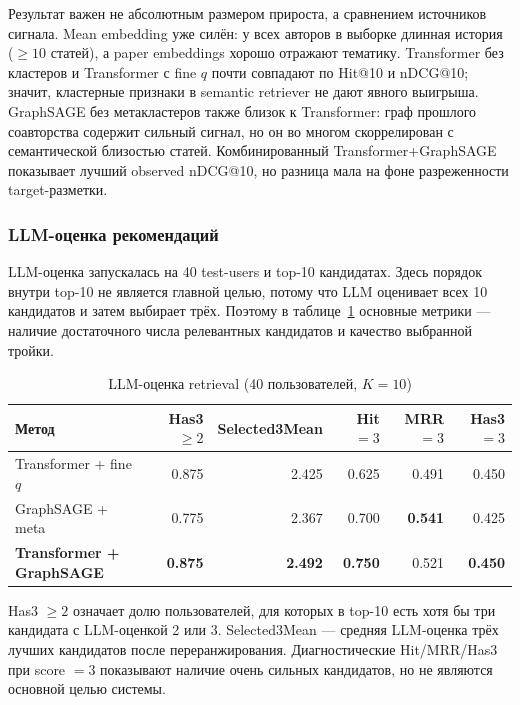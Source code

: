 Результат важен не абсолютным размером прироста, а сравнением источников сигнала. Mean embedding
уже силён: у всех авторов в выборке длинная история ($\geq 10$ статей), а paper embeddings хорошо
отражают тематику. Transformer без кластеров и Transformer с fine $q$ почти совпадают по Hit@10 и
nDCG@10; значит, кластерные признаки в semantic retriever не дают явного выигрыша. GraphSAGE без
метакластеров также близок к Transformer: граф прошлого соавторства содержит сильный сигнал, но он
во многом скоррелирован с семантической близостью статей. Комбинированный Transformer+GraphSAGE
показывает лучший observed nDCG@10, но разница мала на фоне разреженности target-разметки.

\subsubsection{LLM-оценка рекомендаций}

LLM-оценка запускалась на 40 test-users и top-10 кандидатах. Здесь порядок внутри top-10 не является
главной целью, потому что LLM оценивает всех 10 кандидатов и затем выбирает трёх. Поэтому в
таблице~\ref{tab:retrieval-llm} основные метрики — наличие достаточного числа релевантных
кандидатов и качество выбранной тройки.

\begin{table}[ht]
\caption{LLM-оценка retrieval (40 пользователей, $K = 10$)}
\label{tab:retrieval-llm}
\centering
\scriptsize
\setlength{\tabcolsep}{3pt}
\begin{tabular}{lrrrrr}
\toprule
Метод & Has3 $\geq 2$ & Selected3Mean & Hit $=3$ & MRR $=3$ & Has3 $=3$ \\
\midrule
Transformer + fine $q$ & 0.875 & 2.425 & 0.625 & 0.491 & 0.450 \\
GraphSAGE + meta & 0.775 & 2.367 & 0.700 & \textbf{0.541} & 0.425 \\
\textbf{Transformer + GraphSAGE} & \textbf{0.875} & \textbf{2.492} & \textbf{0.750} & 0.521 & \textbf{0.450} \\
\bottomrule
\end{tabular}
\end{table}

Has3 $\geq 2$ означает долю пользователей, для которых в top-10 есть хотя бы три кандидата с
LLM-оценкой 2 или 3. Selected3Mean — средняя LLM-оценка трёх лучших кандидатов после
переранжирования. Диагностические Hit/MRR/Has3 при score $=3$ показывают наличие очень сильных
кандидатов, но не являются основной целью системы.

